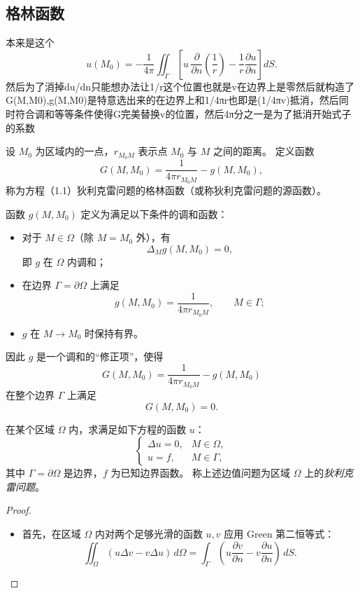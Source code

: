 \begin{note}[式 (2.7) 的来源与意义]
\subsection{格林函数}
\begin{dxtips}
   本来是这个 \[
u(M_0)
= -\frac{1}{4\pi}
\iint_{\Gamma}
\left[
u\,\frac{\partial}{\partial n}\left(\frac{1}{r}\right)
-
\frac{1}{r}\frac{\partial u}{\partial n}
\right]dS.
\]
然后为了消掉du/dn只能想办法让1/r这个位置也就是v在边界上是零然后就构造了G(M,M0),g(M,M0)是特意选出来的在边界上和1/4πr也即是(1/4πv)抵消，然后同时符合调和等等条件使得G完美替换v的位置，然后4π分之一是为了抵消开始式子的系数
\end{dxtips}
\begin{definition}[狄利克雷问题的格林函数]
设 $M_0$ 为区域内的一点，$r_{M_0M}$ 表示点 $M_0$ 与 $M$ 之间的距离。
定义函数
\[
G(M,M_0)=\frac{1}{4\pi r_{M_0M}} - g(M,M_0),
\]
称为方程（1.1）狄利克雷问题的格林函数（或称狄利克雷问题的源函数）。
\end{definition}
\begin{note}
    函数 $g(M,M_0)$ 定义为满足以下条件的调和函数：

\begin{itemize}
  \item 对于 $M\in \Omega$（除 $M=M_0$ 外），有
  \[
  \Delta_M g(M,M_0)=0,
  \]
  即 $g$ 在 $\Omega$ 内调和；
  \item 在边界 $\Gamma=\partial\Omega$ 上满足
  \[
  g(M,M_0)=\frac{1}{4\pi r_{M_0 M}},
  \qquad M\in \Gamma;
  \]
  \item $g$ 在 $M\to M_0$ 时保持有界。
\end{itemize}

因此 $g$ 是一个调和的“修正项”，使得
\[
G(M,M_0)=\frac{1}{4\pi r_{M_0 M}}-g(M,M_0)
\]
在整个边界 $\Gamma$ 上满足
\[
G(M,M_0)=0.
\]
\end{note}
\begin{definition}
在某个区域 $\Omega$ 内，求满足如下方程的函数 $u$：
\[
\begin{cases}
\Delta u = 0, & M\in\Omega,\\[4pt]
u = f, & M\in\Gamma,
\end{cases}
\]
其中 $\Gamma=\partial\Omega$ 是边界，$f$ 为已知边界函数。
称上述边值问题为区域 $\Omega$ 上的\emph{狄利克雷问题}。
\end{definition}
\begin{proof}
\begin{itemize}

  \item 首先，在区域 $\Omega$ 内对两个足够光滑的函数 $u,v$ 应用 Green 第二恒等式：
  \[
    \iint_\Omega (u\Delta v - v\Delta u)\, d\Omega
    =
    \int_\Gamma \left( u\frac{\partial v}{\partial n}
      - v\frac{\partial u}{\partial n}\right)\, dS . 
  \tag{2.3}
  \]


\end{itemize}
\end{proof}
\end{note}
